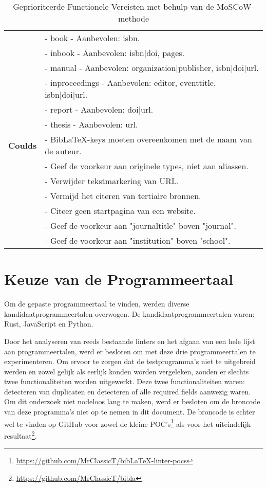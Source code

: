 \begin{table}[ht]
\begin{tabular}{p{2.5cm} p{13cm}}
        & - book - Aanbevolen: isbn. \\
        & - inbook - Aanbevolen: isbn|doi, pages. \\
        & - manual - Aanbevolen: organization|publisher, isbn|doi|url. \\
        & - inproceedings - Aanbevolen: editor, eventtitle, isbn|doi|url. \\
        & - report - Aanbevolen: doi|url. \\
        & - thesis - Aanbevolen: url. \\
        \midrule
        \textbf{Coulds} & 
          - BibLaTeX-keys moeten overeenkomen met de naam van de auteur. \\
        & - Geef de voorkeur aan originele types, niet aan aliassen. \\
        & - Verwijder tekstmarkering van URL. \\
        & - Vermijd het citeren van tertiaire bronnen. \\
        & - Citeer geen startpagina van een website. \\
        & - Geef de voorkeur aan "journaltitle" boven "journal". \\
        & - Geef de voorkeur aan "institution" boven "school". \\
        \bottomrule
    \end{tabular}
    \caption[Geprioriteerde Functionele Vereisten | MoSCoW]{Geprioriteerde Functionele Vereisten met behulp van de MoSCoW-methode}
    \label{tab:functional_requirements}
    \end{table}

\section{Keuze van de Programmeertaal}
\label{sec:mini-pocs}
Om de gepaste programmeertaal te vinden, werden diverse kandidaatprogrammeertalen overwogen. De kandidaatprogrammeertalen waren: Rust, JavaScript en Python.

Door het analyseren van reeds bestaande linters en het afgaan van een hele lijst aan programmeertalen, werd er besloten om met deze drie programmeertalen te experimenteren. Om ervoor te zorgen dat de testprogramma's niet te uitgebreid werden en zowel gelijk als eerlijk konden worden vergeleken, zouden er slechts twee functionaliteiten worden uitgewerkt. Deze twee functionaliteiten waren: detecteren van duplicaten en detecteren of alle required fields aanwezig waren. Om dit onderzoek niet nodeloos lang te maken, werd er besloten om de broncode van deze programma's niet op te nemen in dit document. De broncode is echter wel te vinden op GitHub voor zowel de kleine \acrfull{POC}'s\footnote{\url{https://github.com/MrClassicT/bibLaTeX-linter-pocs}} als voor het uiteindelijk resultaat\footnote{\url{https://github.com/MrClassicT/bibla}}.

